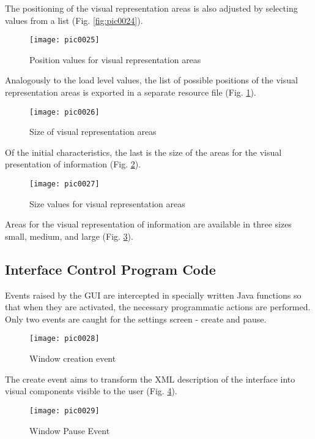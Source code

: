 The positioning of the visual representation areas is also adjusted by selecting values from a list (Fig. \ref{fig:pic0024}).

\begin{figure}[h]
\centering
\texttt{[image: pic0025]}
\caption{Position values for visual representation areas}
\label{fig:pic0025}
\end{figure}
\FloatBarrier

Analogously to the load level values, the list of possible positions of the visual representation areas is exported in a separate resource file (Fig. \ref{fig:pic0025}).

\begin{figure}[h]
\centering
\texttt{[image: pic0026]}
\caption{Size of visual representation areas}
\label{fig:pic0026}
\end{figure}
\FloatBarrier

Of the initial characteristics, the last is the size of the areas for the visual presentation of information (Fig. \ref{fig:pic0026}).

\begin{figure}[h]
\centering
\texttt{[image: pic0027]}
\caption{Size values for visual representation areas}
\label{fig:pic0027}
\end{figure}
\FloatBarrier

Areas for the visual representation of information are available in three sizes small, medium, and large (Fig. \ref{fig:pic0027}).

\subsection{Interface Control Program Code}

Events raised by the GUI are intercepted in specially written Java functions so that when they are activated, the necessary programmatic actions are performed. Only two events are caught for the settings screen - create and pause.

\begin{figure}[h]
\centering
\texttt{[image: pic0028]}
\caption{Window creation event}
\label{fig:pic0028}
\end{figure}
\FloatBarrier

The create event aims to transform the XML description of the interface into visual components visible to the user (Fig. \ref{fig:pic0028}).

\begin{figure}[h]
\centering
\texttt{[image: pic0029]}
\caption{Window Pause Event}
\label{fig:pic0029}
\end{figure}
\FloatBarrier

